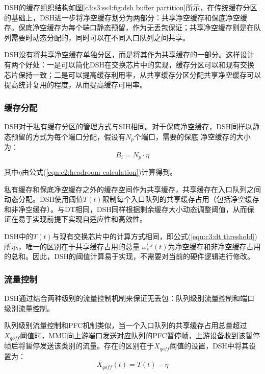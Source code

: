 DSH的缓存组织结构如图\ref{c3:s3:ss4:fig:dsh buffer partition}所示，在传统缓存分区的基础上，DSH进一步将净空缓存划分为两部分：共享净空缓存和保底净空缓存。保底净空缓存为每个端口静态预留，作为无丢包保证；共享净空缓存则是在队列需要时动态分配的，同时可以在不同入口队列之间共享。

DSH没有将共享净空缓存单独分区，而是将其作为共享缓存的一部分。这样设计有两个好处：一是可以简化DSH在交换芯片中的实现，缓存分区可以和现有交换芯片保持一致；二是可以提高缓存利用率，从共享缓存分区分配共享净空缓存可以提高统计复用的程度，从而提高缓存可用率。

\subsubsection{缓存分配}

DSH对于私有缓存分区的管理方式与SIH相同。对于保底净空缓存，DSH同样以静态预留的方式为每个端口分配，假设有$N_p$个端口，需要的保底 净空缓存的大小为：
\begin{equation}
  B_i = N_p \cdot \eta
  \label{eqn:c3:total reserved headroom in dsh}
\end{equation}

\noindent 其中$\eta$由公式(\ref{eqn:c2:headroom calculation})计算得到。

私有缓存和保底净空缓存之外的缓存空间作为共享缓存，共享缓存在入口队列之间动态分配。DSH使用阈值$T(t)$限制每个入口队列的共享缓存占用（包括净空缓存和非净空缓存）。与DT相同，DSH同样根据剩余缓存大小动态调整阈值，从而保证在易于实现前提下实现自适应性和高效性。

DSH中的$T(t)$与现有交换芯片中的计算方式相同，即公式(\ref{eqn:c3:dt threshold})所示，唯一的区别在于共享缓存占用的总量
$ω_s^{i,j}(t)$为净空缓存和非净空缓存占用的总和。因此，DSH的阈值计算易于实现，不需要对当前的硬件逻辑进行修改。

\subsubsection{流量控制}

DSH通过结合两种级别的流量控制机制来保证无丢包：队列级别流量控制和端口级别流量控制。

队列级别流量控制和PFC机制类似，当一个入口队列的共享缓存占用总量超过$X_{qoff}$阈值时，MMU向上游端口发送对应队列的PFC暂停帧，上游设备收到该暂停帧后将暂停发送该类别的流量。存在的区别在于$X_{qoff}$阈值的设置，DSH中将其设置为：
\begin{equation}
  X_{qoff}(t) = T(t) - \eta
  \label{eqn:c3:total reserved headroom in dsh}
\end{equation}

